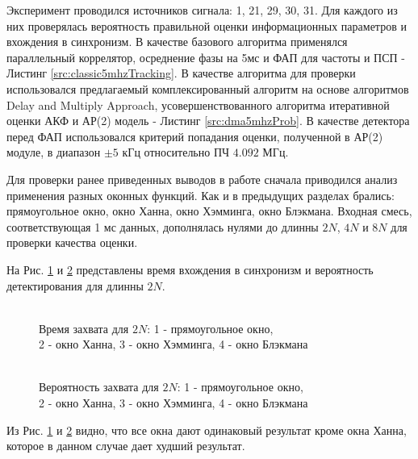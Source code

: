 Эксперимент проводился источников сигнала: 1, 21, 29, 30, 31. Для каждого из них проверялась вероятность правильной оценки информационных параметров и вхождения в синхронизм.
В качестве базового алгоритма применялся параллельный коррелятор, осреднение фазы на 5мс и ФАП для частоты и ПСП - Листинг \ref{src:classic5mhzTracking}. В качестве алгоритма для проверки
использовался предлагаемый комплексированный алгоритм на основе алгоритмов Delay and Multiply Approach, усовершенствованного алгоритма итеративной оценки АКФ и
АР(2) модель - Листинг \ref{src:dma5mhzProb}. В качестве детектора перед ФАП использовался критерий попадания оценки, полученной в АР(2) модуле, в диапазон ${\pm 5}$ кГц относительно
ПЧ ${4.092}$ МГц. 

Для проверки ранее приведенных выводов в работе сначала приводился анализ применения разных оконных функций. Как и в предыдущих разделах брались: прямоугольное окно,
окно Ханна, окно Хэмминга, окно Блэкмана. Входная смесь, соответствующая 1 мс данных, дополнялась нулями до длинны ${2N}$, ${4N}$ и ${8N}$ для проверки качества
оценки.

На Рис. \ref{pic:dma5mhz_2fft_lockTime} и \ref{pic:dma5mhz_2fft_probDetection} представлены время вхождения в синхронизм и вероятность детектирования для длинны ${2N}$.
\begin{figure}[h]
\center{}
	\caption{\\Время захвата для ${2N}$: 1 - прямоугольное окно,\\2 - окно Ханна, 3 - окно Хэмминга, 4 - окно Блэкмана}
	\label{pic:dma5mhz_2fft_lockTime}
\end{figure}
\begin{figure}[h]
\center{}
	\caption{\\Вероятность захвата для ${2N}$: 1 - прямоугольное окно,\\2 - окно Ханна, 3 - окно Хэмминга, 4 - окно Блэкмана}
	\label{pic:dma5mhz_2fft_probDetection}
\end{figure}
Из Рис. \ref{pic:dma5mhz_2fft_lockTime} и \ref{pic:dma5mhz_2fft_probDetection} видно, что все окна дают одинаковый результат кроме окна Ханна, которое в данном случае дает худший результат.

